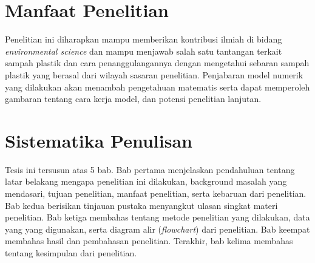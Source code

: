 \begin{spacing}{1.5}
	\section[Manfaat Penelitian]{Manfaat Penelitian}
	
	Penelitian ini diharapkan mampu memberikan kontribusi ilmiah di bidang \textit{environmental science} dan mampu menjawab salah satu tantangan terkait sampah plastik dan cara penanggulangannya dengan mengetahui sebaran sampah plastik yang berasal dari wilayah sasaran penelitian. Penjabaran model numerik yang dilakukan akan menambah pengetahuan matematis serta dapat memperoleh gambaran tentang cara kerja model, dan potensi penelitian lanjutan.

	\section[Sistematika Penulisan]{Sistematika Penulisan}

	Tesis ini tersusun atas 5 bab. Bab pertama menjelaskan pendahuluan tentang latar belakang mengapa penelitian ini dilakukan, background masalah yang mendasari, tujuan penelitian, manfaat penelitian, serta kebaruan dari penelitian. Bab kedua berisikan tinjauan pustaka menyangkut ulasan singkat materi penelitian. Bab ketiga membahas tentang metode penelitian yang dilakukan, data yang yang digunakan, serta diagram alir (\textit{flowchart}) dari penelitian. Bab keempat membahas hasil dan pembahasan penelitian. Terakhir, bab kelima membahas tentang kesimpulan dari penelitian.
	
\end{spacing}